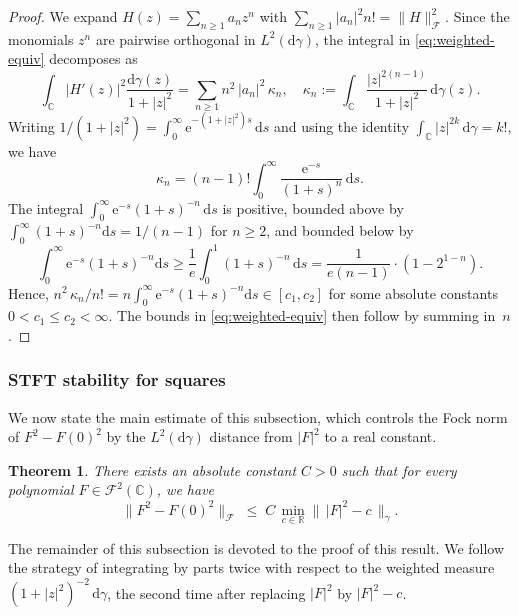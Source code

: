 \documentclass[a4paper,11pt,reqno]{amsart}
\numberwithin{equation}{section}
\theoremstyle{plain} %
\newtheorem{theorem}{Theorem}
\theoremstyle{definition} %
\theoremstyle{remark}
\newcommand{\C}{\mathbb{C}}
\newcommand{\abs}[1]{\lvert #1 \rvert}
\newcommand{\norm}[1]{\lVert #1 \rVert}
\newcommand{\dd}{\mathrm{d}}
\newcommand{\ee}{\mathrm{e}}
\begin{document}
\begin{proof}
We expand $H(z) = \sum_{n \ge 1} a_n z^n$ with $\sum_{n\ge1} \abs{a_n}^2 n!
= \norm{H}_{\mathcal{F}}^2$. Since the monomials $z^n$ are pairwise
orthogonal in $L^2(\dd\gamma)$, the integral in
\eqref{eq:weighted-equiv} decomposes as
\[
\int_{\C} \abs{H'(z)}^2 \frac{\dd\gamma(z)}{1+\abs{z}^2}
= \sum_{n \ge 1} n^2\, \abs{a_n}^2\, \kappa_n,
\quad
\kappa_n := \int_{\C} \frac{\abs{z}^{2(n-1)}}{1+\abs{z}^2}\, \dd\gamma(z).
\]
Writing $1/(1+\abs{z}^2) = \int_0^\infty \ee^{-(1+\abs{z}^2)s}\,\dd s$ and
using the identity $\int_{\C}\abs{z}^{2k}\,\dd\gamma = k!$, we have
\[
\kappa_n
= (n-1)! \int_0^\infty \frac{\ee^{-s}}{(1+s)^n}\, \dd s.
\]
The integral $\int_0^\infty \ee^{-s}(1+s)^{-n}\,\dd s$ is positive, bounded
above by $\int_0^\infty (1+s)^{-n}\dd s = 1/(n-1)$ for $n \ge 2$, and bounded
below by 
$$\int_0^\infty \ee^{-s}(1+s)^{-n}\dd s \geq \frac{1}{e} \int_0^1 (1+s)^{-n} \, \dd s =  \frac{1}{e(n-1)} \cdot \left( 1 - 2^{1-n}\right).$$ Hence,
$n^2\,\kappa_n / n! = n \int_0^\infty \ee^{-s}(1+s)^{-n}\dd s \in [c_1, c_2]$
for some absolute constants $0 < c_1 \le c_2 < \infty$. The bounds in
\eqref{eq:weighted-equiv} then follow by summing in~$n$.
\end{proof}

\subsubsection{STFT stability for squares}\label{sec:squaring}
We now state the main estimate of this subsection, which controls the
Fock norm of $F^2 - F(0)^2$ by the $L^2(\dd\gamma)$ distance from
$\abs{F}^2$ to a real constant.

\begin{theorem}\label{thm:squaring}
There exists an absolute constant $C > 0$ such that for every polynomial
$F \in \mathcal{F}^2(\C)$, we have
\begin{equation}\label{eq:squaring-min}
\norm{F^2 - F(0)^2}_{\mathcal{F}}
\;\le\;
C\, \min_{c \in \mathbb{R}}\bigl\|\, \abs{F}^2 - c \,\bigr\|_{\gamma}.
\end{equation}
\end{theorem}

The remainder of this subsection is devoted to the proof of this result. We follow the strategy
of integrating by parts twice with respect to the weighted measure
$(1+\abs{z}^2)^{-2}\,\dd\gamma$, the second time after replacing $\abs{F}^2$
by $\abs{F}^2 - c$. 
\end{document}
